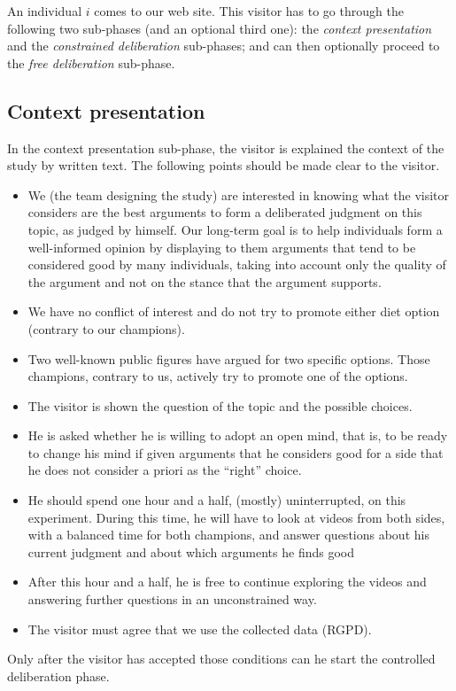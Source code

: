 \documentclass[version=3.21, pagesize, twoside=off, bibliography=totoc, DIV=calc, fontsize=12pt, a4paper]{scrartcl}
\begin{document}
An individual $i$ comes to our web site. This visitor has to go through the following two sub-phases (and an optional third one): the \emph{context presentation} and the \emph{constrained deliberation} sub-phases; and can then optionally proceed to the \emph{free deliberation} sub-phase.

\subsection{Context presentation}
In the context presentation sub-phase, the visitor is explained the context of the study by written text. The following points should be made clear to the visitor.
\begin{itemize}
	\item We (the team designing the study) are interested in knowing what the visitor considers are the best arguments to form a deliberated judgment on this topic, as judged by himself. Our long-term goal is to help individuals form a well-informed opinion by displaying to them arguments that tend to be considered good by many individuals, taking into account only the quality of the argument and not on the stance that the argument supports.
	\item We have no conflict of interest and do not try to promote either diet option (contrary to our champions). 
	\item Two well-known public figures have argued for two specific options. Those champions, contrary to us, actively try to promote one of the options.
	\item The visitor is shown the question of the topic and the possible choices.
	\item He is asked whether he is willing to adopt an open mind, that is, to be ready to change his mind if given arguments that he considers good for a side that he does not consider a priori as the “right” choice. 
	\item He should spend one hour and a half, (mostly) uninterrupted, on this experiment. During this time, he will have to look at videos from both sides, with a balanced time for both champions, and answer questions about his current judgment and about which arguments he finds good   
	\item After this hour and a half, he is free to continue exploring the videos and answering further questions in an unconstrained way.
	\item The visitor must agree that we use the collected data (RGPD).
\end{itemize}
Only after the visitor has accepted those conditions can he start the controlled deliberation phase. 
\end{document}
